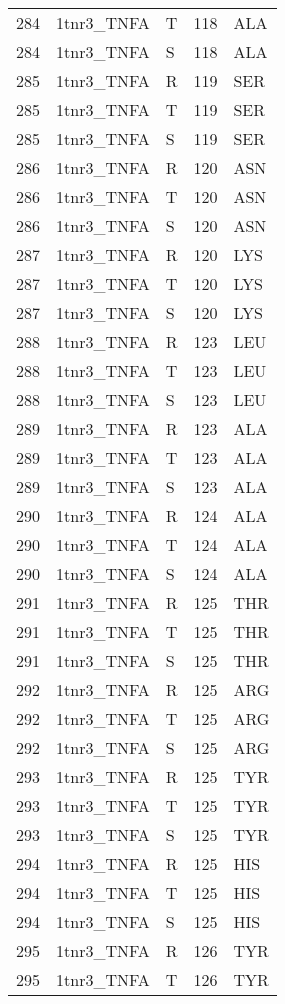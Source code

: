 \begin{tiny}
\begin{longtable}[l]{l|l|l|l|l}
	284 & 1tnr3\_TNFA & T & 118 & ALA \\
	284 & 1tnr3\_TNFA & S & 118 & ALA \\
	285 & 1tnr3\_TNFA & R & 119 & SER \\
	285 & 1tnr3\_TNFA & T & 119 & SER \\
	285 & 1tnr3\_TNFA & S & 119 & SER \\
	286 & 1tnr3\_TNFA & R & 120 & ASN \\
	286 & 1tnr3\_TNFA & T & 120 & ASN \\
	286 & 1tnr3\_TNFA & S & 120 & ASN \\
	287 & 1tnr3\_TNFA & R & 120 & LYS \\
	287 & 1tnr3\_TNFA & T & 120 & LYS \\
	287 & 1tnr3\_TNFA & S & 120 & LYS \\
	288 & 1tnr3\_TNFA & R & 123 & LEU \\
	288 & 1tnr3\_TNFA & T & 123 & LEU \\
	288 & 1tnr3\_TNFA & S & 123 & LEU \\
	289 & 1tnr3\_TNFA & R & 123 & ALA \\
	289 & 1tnr3\_TNFA & T & 123 & ALA \\
	289 & 1tnr3\_TNFA & S & 123 & ALA \\
	290 & 1tnr3\_TNFA & R & 124 & ALA \\
	290 & 1tnr3\_TNFA & T & 124 & ALA \\
	290 & 1tnr3\_TNFA & S & 124 & ALA \\
	291 & 1tnr3\_TNFA & R & 125 & THR \\
	291 & 1tnr3\_TNFA & T & 125 & THR \\
	291 & 1tnr3\_TNFA & S & 125 & THR \\
	292 & 1tnr3\_TNFA & R & 125 & ARG \\
	292 & 1tnr3\_TNFA & T & 125 & ARG \\
	292 & 1tnr3\_TNFA & S & 125 & ARG \\
	293 & 1tnr3\_TNFA & R & 125 & TYR \\
	293 & 1tnr3\_TNFA & T & 125 & TYR \\
	293 & 1tnr3\_TNFA & S & 125 & TYR \\
	294 & 1tnr3\_TNFA & R & 125 & HIS \\
	294 & 1tnr3\_TNFA & T & 125 & HIS \\
	294 & 1tnr3\_TNFA & S & 125 & HIS \\
	295 & 1tnr3\_TNFA & R & 126 & TYR \\
	295 & 1tnr3\_TNFA & T & 126 & TYR \\

\end{longtable}
\end{tiny}
